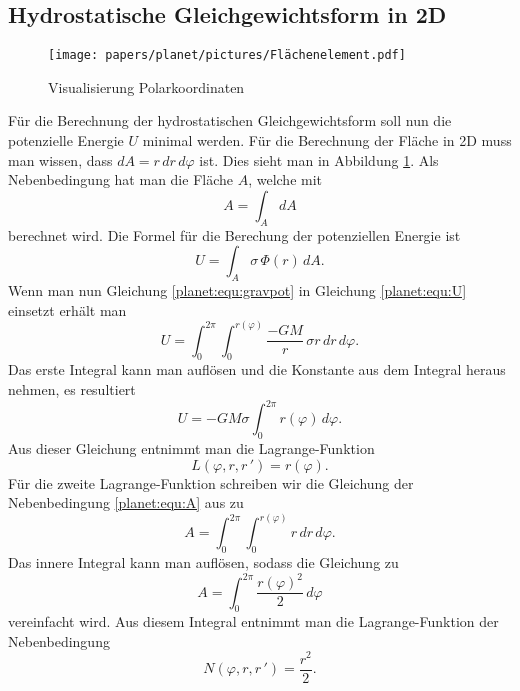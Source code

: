 \subsection{Hydrostatische Gleichgewichtsform in 2D}
\begin{figure}
	\centering
	\texttt{[image: papers/planet/pictures/Flächenelement.pdf]}
	\caption{Visualisierung Polarkoordinaten}
	\label{planet:fig:2d}
\end{figure}
Für die Berechnung der hydrostatischen Gleichgewichtsform soll nun die potenzielle Energie \(U\) minimal werden.
Für die Berechnung der Fläche in 2D muss man wissen, dass \(dA = r \, dr \, d\varphi\) ist.
Dies sieht man in Abbildung \ref{planet:fig:2d}.
Als Nebenbedingung hat man die Fläche \(A\), welche mit 
\begin{equation}
	A = \int_{A}^{} dA
	\label{planet:equ:A}
\end{equation}
berechnet wird.
Die Formel für die Berechung der potenziellen Energie ist
\begin{equation}
	U = \int_{A} \sigma \, \Phi (r) \, dA.
	\label{planet:equ:U}
\end{equation}
Wenn man nun Gleichung \eqref{planet:equ:gravpot} in Gleichung \eqref{planet:equ:U} einsetzt erhält man
\begin{equation*}
	U = \int_{0}^{2\pi}\int_{0}^{r(\varphi)} \frac{-GM}{r} \, \sigma r \, dr \, d\varphi.
\end{equation*}
Das erste Integral kann man auflösen und die Konstante aus dem Integral heraus nehmen, es resultiert 
\begin{equation*}
	U =-GM\sigma \int_{0}^{2\pi} r(\varphi) \, d\varphi .
\end{equation*}
Aus dieser Gleichung entnimmt man die Lagrange-Funktion
\begin{equation*}
	L(\varphi ,r,r\,') = r(\varphi).
\end{equation*}
Für die zweite Lagrange-Funktion schreiben wir die Gleichung der Nebenbedingung \eqref{planet:equ:A} aus zu
\begin{equation*}
	A = \int_{0}^{2\pi}\int_{0}^{r(\varphi)} r \, dr \, d\varphi.
\end{equation*}
Das innere Integral kann man auflösen, sodass die Gleichung zu
\begin{equation*}
	A = \int_{0}^{2\pi}\frac{r(\varphi)^2}{2} \, d\varphi
\end{equation*}
vereinfacht wird.
Aus diesem Integral entnimmt man die Lagrange-Funktion der Nebenbedingung
\begin{equation*}
	N(\varphi ,r,r\,') = \frac{r^2}{2}.
\end{equation*}

